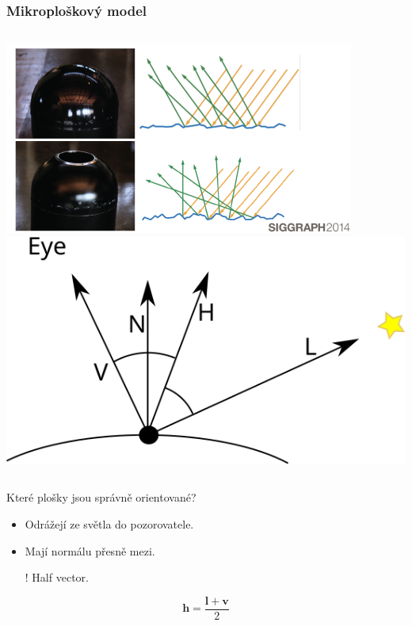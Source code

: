 \begin{frame}
    \frametitle{Mikroploškový model}

    \begin{columns}[c]
    \includegraphics[width=\textwidth]{pics/physicallyBasedRendering/mf}
    \includegraphics[width=\textwidth]{pics/physicallyBasedRendering/half}
    \end{columns}

    Které plošky jsou správně orientované?
    \pause
    \begin{itemize}
        \item Odrážejí ze světla do pozorovatele.
        \item Mají normálu přesně mezi.
        \item[!] Half vector.
    \end{itemize}
    \begin{equation*}
        \mathbf h = \frac{\mathbf l + \mathbf v}{2}
    \end{equation*}
\end{frame}

